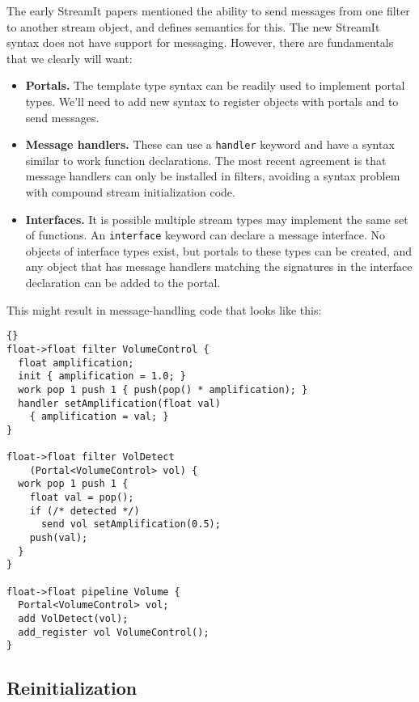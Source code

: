 \documentclass[11pt]{article}
\begin{document}
The early StreamIt papers mentioned the ability to send messages from
one filter to another stream object, and defines semantics for this.
The new StreamIt syntax does not have support for messaging.  However,
there are fundamentals that we clearly will want:

\begin{itemize}

\item \textbf{Portals.}  The template type syntax can be readily used
  to implement portal types.  We'll need to add new syntax to register
  objects with portals and to send messages.

\item \textbf{Message handlers.}  These can use a \lstinline|handler|
  keyword and have a syntax similar to work function declarations.
  The most recent agreement is that message handlers can only be
  installed in filters, avoiding a syntax problem with compound stream
  initialization code.

\item \textbf{Interfaces.}  It is possible multiple stream types may
  implement the same set of functions.  An \lstinline|interface|
  keyword can declare a message interface.  No objects of interface
  types exist, but portals to these types can be created, and any
  object that has message handlers matching the signatures in the
  interface declaration can be added to the portal.

\end{itemize}

This might result in message-handling code that looks like this:

\begin{lstlisting}{}
float->float filter VolumeControl {
  float amplification;
  init { amplification = 1.0; }
  work pop 1 push 1 { push(pop() * amplification); }
  handler setAmplification(float val)
    { amplification = val; }
}

float->float filter VolDetect
    (Portal<VolumeControl> vol) {
  work pop 1 push 1 {
    float val = pop();
    if (/* detected */)
      send vol setAmplification(0.5);
    push(val);
  }
}

float->float pipeline Volume {
  Portal<VolumeControl> vol;
  add VolDetect(vol);
  add_register vol VolumeControl();
}
\end{lstlisting}

\subsection{Reinitialization}
\end{document}
